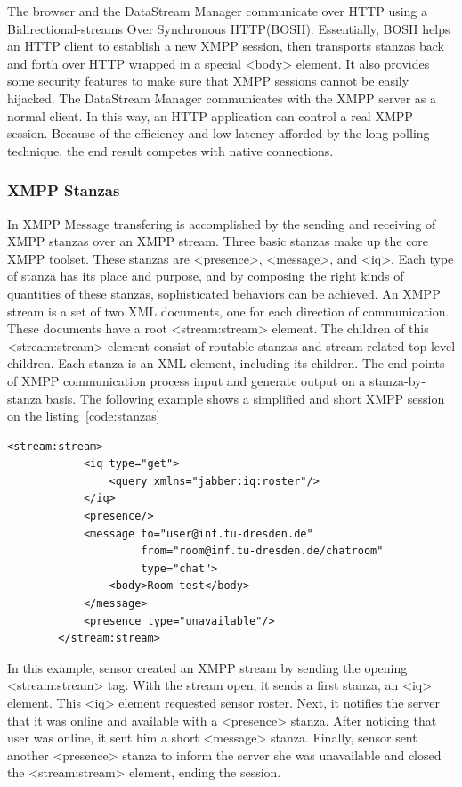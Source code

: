 	The browser and the DataStream Manager communicate over HTTP using a Bidirectional-streams Over Synchronous HTTP(BOSH). Essentially, BOSH helps an HTTP client to establish a new XMPP session, then transports stanzas back and forth over HTTP wrapped in a special <body> element. It also provides some security features to make sure that XMPP sessions cannot be easily hijacked. The DataStream Manager communicates with the XMPP server as a normal client. In this way, an HTTP application can control a real XMPP session. Because of the efficiency and low latency afforded by the long polling technique, the end result competes with native connections.

\subsubsection{XMPP Stanzas}
	In XMPP Message transfering is accomplished by the sending and receiving of XMPP stanzas over an XMPP stream. Three basic stanzas make up the core XMPP toolset. These stanzas are <presence>, <message>, and <iq>. Each type of stanza has its place and purpose, and by composing the right kinds of quantities of these stanzas, sophisticated behaviors can be achieved. An XMPP stream is a set of two XML documents, one for each direction of communication. These documents have a root <stream:stream> element. The children of this <stream:stream> element consist of routable stanzas and stream related top-level children. Each stanza is an XML element, including its children. The end points of XMPP communication process input and generate output on a stanza-by-stanza basis. The following example shows a simplified and short XMPP session on the listing~\ref{code:stanzas}
		\begin{lstlisting}[label=code:stanzas,caption=Stanzas Format]
		<stream:stream>
			<iq type="get">
				<query xmlns="jabber:iq:roster"/>
			</iq>
			<presence/>
			<message to="user@inf.tu-dresden.de"
					 from="room@inf.tu-dresden.de/chatroom"
			         type="chat">
			    <body>Room test</body>
			</message> 
			<presence type="unavailable"/>
		</stream:stream>
		\end{lstlisting}

	In this example, sensor created an XMPP stream by sending the opening <stream:stream> tag. With the stream open, it sends a first stanza, an <iq> element. This <iq> element requested sensor roster. Next, it notifies the server that it was online and available with a <presence> stanza. After noticing that user was online, it sent him a short <message> stanza. Finally, sensor sent another <presence> stanza to inform the server she was unavailable and closed the <stream:stream> element, ending the session.
    
